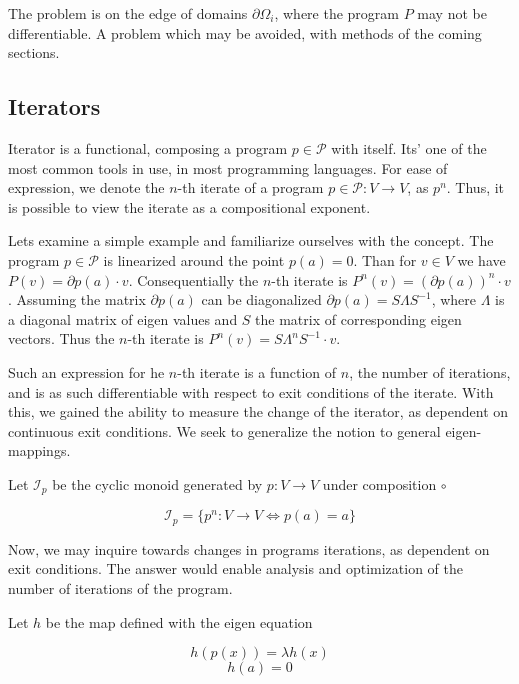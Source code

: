 \documentclass{article}
\newcommand{\dP}{\mathcal{P}}
\newcommand{\D}{\partial}
\begin{document}
 The problem is on the edge of domains $\partial\Omega_i$, where the program $P$ may not be differentiable. A problem which may be avoided, with methods of the coming sections.
 
  \subsection{Iterators}
  
  Iterator is a functional, composing a program $p\in\dP$ with itself. Its' one of the most common tools in use, in most programming languages. For ease of expression, we denote the $n$-th iterate of a program $p\in\dP:V\to V$, as $p^n$. Thus, it is possible to view the iterate as a compositional exponent.
  
  Lets examine a simple example and familiarize ourselves with the concept. The program $p\in\dP$ is linearized around the point $p(a)=0$. Than for $v\in V$ we have $P(v)=\D p(a)\cdot v$. Consequentially the $n$-th iterate is $P^n(v)=(\D p(a))^n\cdot v$. Assuming the matrix $\D p(a)$ can be diagonalized $\D p(a)=S\Lambda S^{-1}$, where $\Lambda$ is a diagonal matrix of eigen values and $S$ the matrix of corresponding eigen vectors. Thus the $n$-th iterate is $P^n(v)=S\Lambda^nS^{-1}\cdot v$.
  
  Such an expression for he $n$-th iterate is a function of $n$, the number of iterations, and is as such differentiable with respect to exit conditions of the iterate. With this, we gained the ability to measure the change of the iterator, as dependent on continuous exit conditions. We seek to generalize the notion to general eigen-mappings.
  
  Let $\mathcal{I}_p$ be the cyclic monoid generated by $p:V\to V$ under composition $\circ$
  
  \begin{equation}
  \mathcal{I}_p=\{p^n:V\to V\iff p(a)=a\}
  \end{equation}
  
  Now, we may inquire towards changes in programs iterations, as dependent on exit conditions. The answer would enable analysis and optimization of the number of iterations of the program. 
  
  Let $h$ be the map defined with the eigen equation
    
  \begin{equation}\label{eq:kh}
  h(p(x))=\lambda h(x)
  \end{equation}
   \begin{equation}
   h(a)=0
   \end{equation}
  
\end{document}
